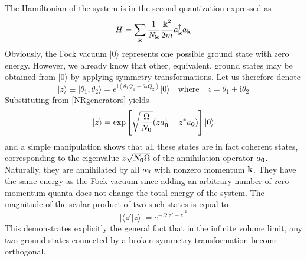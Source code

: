 \documentclass[final,2p,times,12pt,sort&compress]{elsarticle}
\newcommand\vek[1]{{\boldsymbol{\bf #1}}}   %
\newcommand\ket[1]{\vert#1\rangle}          %
\newcommand\braket[2]{\langle#1\vert#2\rangle} %
\newcommand\he[1]{#1^{\dagger}}             %
\newcommand\imag{\mathrm i}                 %
\newcommand\vt{\theta}
\newcommand\abs[1]{\left|#1\right|}         %
\begin{document}
The Hamiltonian of the system is in the second quantization expressed as
\begin{equation}
H=\sum_{\vek k}\frac1{N_{\vek k}}\frac{\vek k^2}{2m}\he a_{\vek k}a_{\vek k}
\label{NRHamiltonian}
\end{equation}
Obviously, the Fock vacuum $\ket0$ represents one possible ground state with
zero energy. However, we already know that other, equivalent, ground states may
be obtained from $\ket0$ by applying symmetry transformations. Let us therefore
denote
\begin{equation}
\ket z\equiv\ket{\vt_1,\vt_2}=e^{\imag(\vt_1Q_1+\vt_2Q_2)}\ket0\quad
\text{where}\quad z=\vt_1+\imag\vt_2
\end{equation}
Substituting from \eqref{NRgenerators} yields
\begin{equation}
\ket z=\exp\left[\sqrt{\frac{\Omega}{N_\vek0}}(z\he
a_{\vek0}-z^*a_{\vek0})\right]\ket0
\end{equation}
and a simple manipulation shows that all these states are in fact coherent
states, corresponding to the eigenvalue $z\sqrt{N_{\vek0}\Omega}$ of the
annihilation operator $a_{\vek0}$. Naturally, they are annihilated by all
$a_{\vek k}$ with nonzero momentum $\vek k$. They have the same energy as the
Fock vacuum since adding an arbitrary number of zero-momentum quanta does not
change the total energy of the system. The magnitude of the scalar product of
two such states is equal to
\begin{equation}
\abs{\braket{z'}{z}}=e^{-\Omega\abs{z'-z}^2}
\end{equation}
This demonstrates explicitly the general fact that in the infinite volume
limit, any two ground states connected by a broken symmetry transformation
become orthogonal.
\end{document}
